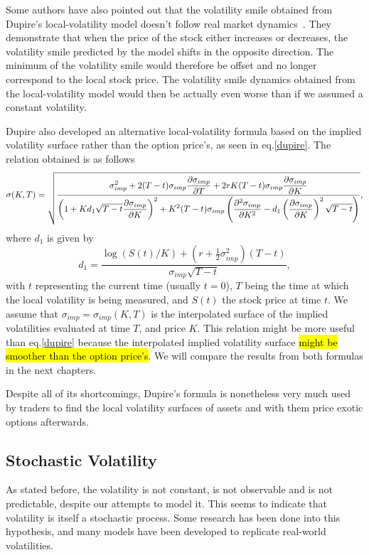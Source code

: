 Some authors have also pointed out that the volatility smile obtained from Dupire's local-volatility model doesn't follow real market dynamics~\cite{Hagan}. They demonstrate that when the price of the stock either increases or decreases, the volatility smile predicted by the model shifts in the opposite direction. The minimum of the volatility smile would therefore be offset and no longer correspond to the local stock price. The volatility smile dynamics obtained from the local-volatility model would then be actually even worse than if we assumed a constant volatility.


Dupire also developed an alternative local-volatility formula based on the implied volatility surface rather than the option price's, as seen in eq.\ref{dupire}.
The relation obtained is as follows
\begin{equation}\label{dupire2}
\sigma(K,T)=\sqrt{\frac{\displaystyle\sigma_{imp}^2+2(T-t)\sigma_{imp}\pdv{\sigma_{imp}}{T}+2rK(T-t)\sigma_{imp}\pdv{\sigma_{imp}}{K}}{\displaystyle\left(1+Kd_1\sqrt{T-t}\pdv{\sigma_{imp}}{K}\right)^2+K^2(T-t)\sigma_{imp}\left(\pdv{^2\sigma_{imp}}{K^2}-d_1\left(\pdv{\sigma_{imp}}{K}\right)^2\sqrt{T-t}\right)}},
\end{equation}
\noindent where $d_1$ is given by
\begin{equation}
d_1=\frac{\log(S(t)/K)+\left(r+\frac{1}{2}\sigma_{imp}^2\right)(T-t)}{\sigma_{imp}\sqrt{T-t}},
\end{equation}
\noindent with $t$ representing the current time (usually $t=0$), $T$ being the time at which the local volatility is being measured, and $S(t)$ the stock price at time $t$. We assume that $\sigma_{imp}=\sigma_{imp}(K,T)$ is the interpolated surface of the implied volatilities evaluated at time $T$, and price $K$.
This relation might be more useful than eq.\eqref{dupire} because the interpolated implied volatility surface \hl{might be smoother than the option price's}. We will compare the results from both formulas in the next chapters.




Despite all of its shortcomings, Dupire's formula is nonetheless very much used by traders to find the local volatility surfaces of assets and with them price exotic options afterwards.

\subsection{Stochastic Volatility}
\label{subsection:stochastic volatility}
As stated before, the volatility is not constant, is not observable and is not predictable, despite our attempts to model it. This seems to indicate that volatility is itself a stochastic process. Some research has been done into this hypothesis, and many models have been developed to replicate real-world volatilities.

